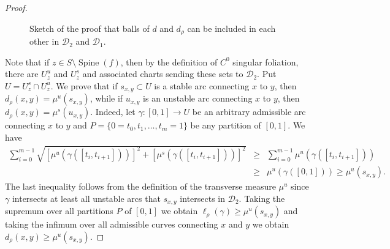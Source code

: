 \documentclass{amsart}
\theoremstyle{plain}
\theoremstyle{definition}
\newcommand{\mc}{\mathcal}
\newcommand{\spine}{\operatorname{Spine}}
\begin{document}
\begin{proof}
\begin{figure}[ht]
{
}

    \caption{Sketch of the proof that balls of $d$ and $d_\rho$ can be included in each other in $\mc{D}_2$ and $\mc{D}_1$.}
    \label{fig:sketch}
\end{figure}

Note that if 
$z\in S\setminus \spine(f)$, then by the definition of $C^0$ singular foliation, there are $U^u_z$ and $U^s_z$
and associated charts sending these sets to $\mc{D}_2$.
Put $U=U_z^s\cap U_z^u$.
We prove that if
$s_{x,y}\subset U$ is a stable arc connecting $x$ to $y$, then $d_\rho(x,y)=\mu^u(s_{x,y})$, while if $u_{x,y}$ is an unstable arc connecting $x$ to $y$, then $d_\rho(x,y)=\mu^s(u_{x,y})$. 
Indeed, let $\gamma\colon[0,1]\to U$ be an arbitrary admissible arc connecting $x$ to $y$ and $P=\{0=t_0,t_1,\dots,t_m=1\}$ be any partition of $[0,1]$. We have
\begin{eqnarray*}
\sum_{i=0}^{m-1} \sqrt{\left[ \mu^u(\gamma([t_i, t_{i+1}])) \right]^2 + \left[ \mu^s(\gamma([t_i, t_{i+1}])) \right]^2} &\geq& \sum_{i=0}^{m-1} \mu^u(\gamma([t_i, t_{i+1}]))\\
&\geq& \mu^u(\gamma([0,1])) \geq \mu^u(s_{x,y}).
\end{eqnarray*}
The last inequality follows from the definition of the transverse measure $\mu^u$ since $\gamma$ intersects at least all unstable arcs that $s_{x,y}$ intersects in $\mc{D}_2$. Taking the supremum over all partitions $P$ of $[0,1]$ we obtain $\ell_{\rho}(\gamma)\geq \mu^u(s_{x,y})$ and taking the infimum over all admissible curves connecting $x$ and $y$ we obtain $d_{\rho}(x,y)\geq \mu^u(s_{x,y})$.


\end{proof}
\end{document}
